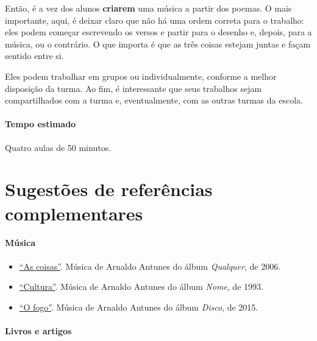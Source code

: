 \documentclass[11pt]{extarticle}
\begin{document}
Então, é a vez dos alunos \textbf{criarem} uma música a partir dos poemas.
O mais importante, aqui, é deixar claro que não há uma ordem
correta para o trabalho: eles podem começar escrevendo os versos
e partir para o desenho e, depois, para a música, ou o contrário. 
O que importa é que as três coisas estejam juntas e façam sentido entre si.

Eles podem trabalhar em grupos ou individualmente,
conforme a melhor disposição da turma. 
Ao fim, é interessante que seus trabalhos sejam compartilhados
com a turma e, eventualmente, com as outras turmas da escola.

\paragraph{Tempo estimado} Quatro aulas de 50 minutos.


\section{Sugestões de referências complementares}

\paragraph{Música}

\begin{itemize}
\item \href{https://www.youtube.com/watch?v=JF4MruZSwzg}{``As coisas''}. Música de Arnaldo Antunes do álbum \textit{Qualquer}, de 2006.  

\item \href{https://www.youtube.com/watch?v=Aguu_QzCQy8}{``Cultura''}. Música de Arnaldo Antunes do álbum \textit{Nome}, de 1993.  

\item \href{https://www.youtube.com/watch?v=kUgUNHj2VlE}{``O fogo''}. Música de Arnaldo Antunes do álbum \textit{Disco}, de 2015.  
\end{itemize}


\paragraph{Livros e artigos}
\end{document}
